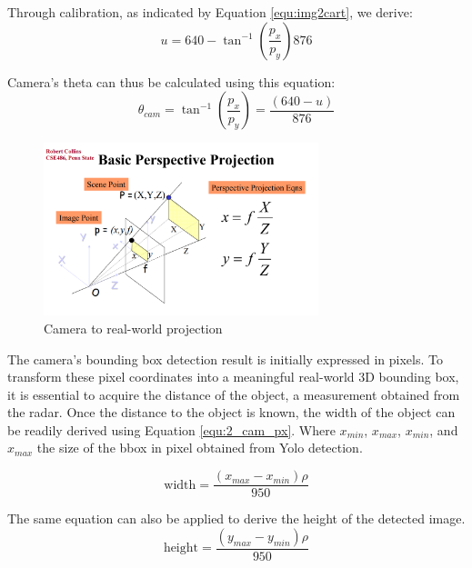 Through calibration, as indicated by Equation \ref{equ:img2cart}, we derive:
\begin{equation}\label{equ:2_img2cart2}
    u=640-\tan^{-1}(\frac{p_x}{p_y})876
\end{equation}

Camera's theta can thus be calculated using this equation:
\begin{equation}\label{equ:2_cam_px}
    \theta_{cam}=
    \tan^{-1}(\frac{p_x}{p_y})=
    \frac
    {(640-u)}
    {876}
\end{equation}
\begin{figure}[hpbt]
    \centering
    \includegraphics[width=8cm]{Figures/cam_projection.png}%
    \caption{Camera to real-world projection}
    \label{fig:camera_projection}
\end{figure}

The camera's bounding box detection result is initially expressed in pixels. 
To transform these pixel coordinates into a meaningful real-world 3D bounding box, 
it is essential to acquire the distance of the object, 
a measurement obtained from the radar. 
Once the distance to the object is known, the width of the object can be readily derived using Equation \ref{equ:2_cam_px}.
Where $x_{min}$, $x_{max}$, $x_{min}$, and $x_{max}$ the size of the bbox in pixel obtained from Yolo detection. 

\begin{equation}\label{equ:2_cam_width}
    \text{width}=
    \frac
    {(x_{max}-x_{min})\rho}
    {950}
\end{equation}

The same equation can also be applied to derive the height of the detected image. 
\begin{equation}\label{equ:2_cam_height}
    \text{height}=
    \frac
    {(y_{max}-y_{min})\rho}
    {950}
\end{equation}



